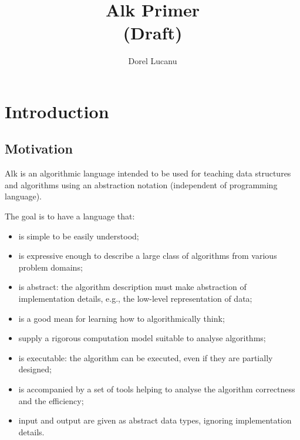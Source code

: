\documentclass[a4paper]{report}
\title{Alk Primer \medskip\\ \large (Draft)}
\author{Dorel Lucanu}
\begin{document}
\maketitle

\chapter{Introduction}

\section{Motivation}

Alk is an algorithmic language intended to be used for teaching data structures and algorithms using an abstraction notation (independent of programming language).

The goal is to have a language that:
\begin{itemize}
\item is simple to be easily understood;
\item is expressive enough to describe a large class of algorithms from various problem domains;
\item is abstract: the algorithm description must make abstraction of implementation details, e.g., the low-level representation of data;
\item is a good mean for learning how to algorithmically think;
\item supply a rigorous computation model suitable to analyse algorithms;
\item is executable: the algorithm can be executed, even if they are partially designed;
\item is accompanied by a set of tools helping to analyse the algorithm correctness and the efficiency;
\item input and output are given as abstract data types, ignoring implementation details.
\end{itemize}
\end{document}
